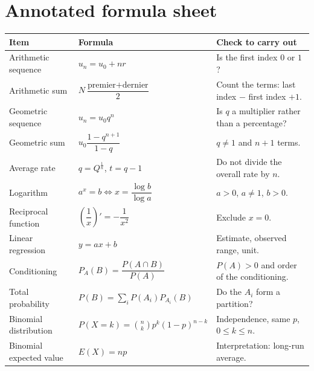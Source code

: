\chapter{Annotated formula sheet}
\begin{longtable}{p{}p{}p{}}
\toprule
Item & Formula & Check to carry out\\
\midrule
Arithmetic sequence & $u_n=u_0+nr$ & Is the first index $0$ or $1$?\\
Arithmetic sum & $N\dfrac{\text{premier}+\text{dernier}}2$ & Count the terms: last index $-$ first index $+1$.\\
Geometric sequence & $u_n=u_0q^n$ & Is $q$ a multiplier rather than a percentage?\\
Geometric sum & $u_0\dfrac{1-q^{n+1}}{1-q}$ & $q\neq1$ and $n+1$ terms.\\
Average rate & $q=Q^{\frac1n}$, $t=q-1$ & Do not divide the overall rate by $n$.\\
Logarithm & $a^x=b\iff x=\dfrac{\log b}{\log a}$ & $a>0$, $a\neq1$, $b>0$.\\
Reciprocal function & $\left(\dfrac1x\right)'=-\dfrac1{x^2}$ & Exclude $x=0$.\\
Linear regression & $y=ax+b$ & Estimate, observed range, unit.\\
Conditioning & $P_A(B)=\dfrac{P(A\cap B)}{P(A)}$ & $P(A)>0$ and order of the conditioning.\\
Total probability & $P(B)=\sum_iP(A_i)P_{A_i}(B)$ & Do the $A_i$ form a partition?\\
Binomial distribution & $P(X=k)=\binom nkp^k(1-p)^{n-k}$ & Independence, same $p$, $0\leq k\leq n$.\\
Binomial expected value & $E(X)=np$ & Interpretation: long-run average.\\
\bottomrule
\end{longtable}
